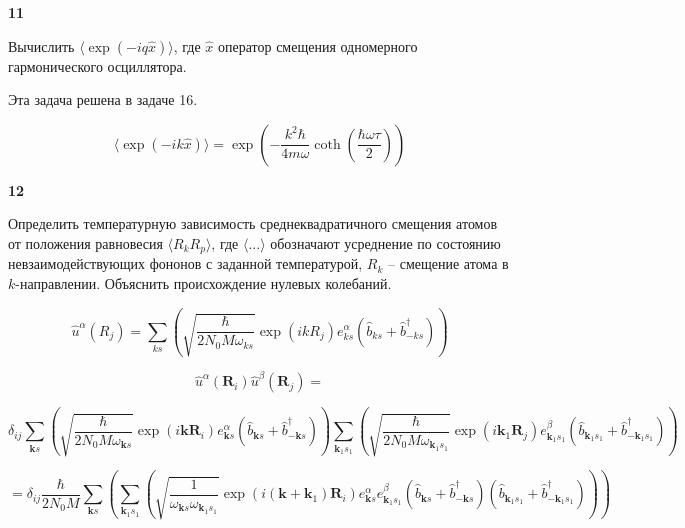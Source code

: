 \documentclass[a4paper,12pt]{article} %
\begin{document}
\begin{task}

\textbf{11}

Вычислить  $\langle\exp (-i q \hat{x})\rangle$, где  $\hat{x}$ оператор смещения одномерного гармонического осциллятора.




Эта задача решена в задаче 16.




$$
\langle\exp (-i k \widehat{x})\rangle=\exp \left(-\frac{k^{2} \hbar}{4 m \omega} \operatorname{coth}\left(\frac{\hbar \omega \tau}{2}\right)\right)
$$





\end{task}


\begin{task}

\textbf{12}

Определить температурную зависимость среднеквадратичного смещения атомов от положения равновесия $ \langle R_k R_p \rangle$, 
где $ \langle ... \rangle$ обозначают усреднение по состоянию невзаимодействующих фононов с заданной температурой,  
$R_k$ – смещение атома в $k$-направлении. 
Объяснить происхождение нулевых колебаний.






$$
\widehat{u}^{\alpha}\left(R_{j}\right)=\sum_{k s}\left(\sqrt{\frac{\hbar}{2 N_{0} M \omega_{k s}}} \exp \left(i k R_{j}\right) e_{k s}^{\alpha}\left(\widehat{b}_{k s}+\hat{b}_{-k s}^{\dagger}\right)\right)
$$





$$
\widehat{u}^{\alpha}\left(\boldsymbol{R}_{i}\right) \hat{u}^{\beta}\left(\boldsymbol{R}_{j}\right)=
$$


$$
\delta_{i j} \sum_{\boldsymbol{k} s}\left(\sqrt{\frac{\hbar}{2 N_{0} M \omega_{\boldsymbol{k} s}}} \exp \left(i \boldsymbol{k} \boldsymbol{R}_{i}\right) e_{\boldsymbol{k} s}^{\alpha}\left(\widehat{b}_{\boldsymbol{k} s}+\widehat{b}_{-\boldsymbol{k} s}^{\dagger}\right)\right) \sum_{\boldsymbol{k}_{1} s_{1}}\left(\sqrt{\frac{\hbar}{2 N_{0} M \omega_{\boldsymbol{k}_{1} s_{1}}}} \exp \left(i \boldsymbol{k}_{1} \boldsymbol{R}_{j}\right) e_{\boldsymbol{k}_{1} s_{1}}^{\beta}\left(\widehat{b}_{\boldsymbol{k}_{1} s_{1}}+\widehat{b}_{-\boldsymbol{k}_{1} s_{1}}^{\dagger}\right)\right)
$$



$$
=\delta_{i j} \frac{\hbar}{2 N_{0} M} \sum_{\boldsymbol{k} s}\left(\sum_{\boldsymbol{k}_{1} s_{1}}\left(\sqrt{\frac{1}{\omega_{\boldsymbol{k} s} \omega_{\boldsymbol{k}_{1} s_{1}}}} \exp \left(i\left(\boldsymbol{k}+\boldsymbol{k}_{1}\right) \boldsymbol{R}_{i}\right) e_{\boldsymbol{k} s}^{\alpha} e_{\boldsymbol{k}_{1} s_{1}}^{\beta}\left(\widehat{b}_{\boldsymbol{k} s}+\widehat{b}_{-\boldsymbol{k} s}^{\dagger}\right)\left(\widehat{b}_{\boldsymbol{k}_{1} s_{1}}+\widehat{b}_{-\boldsymbol{k}_{1} s_{1}}^{\dagger}\right)\right)\right)
$$




\end{task}
\end{document}
